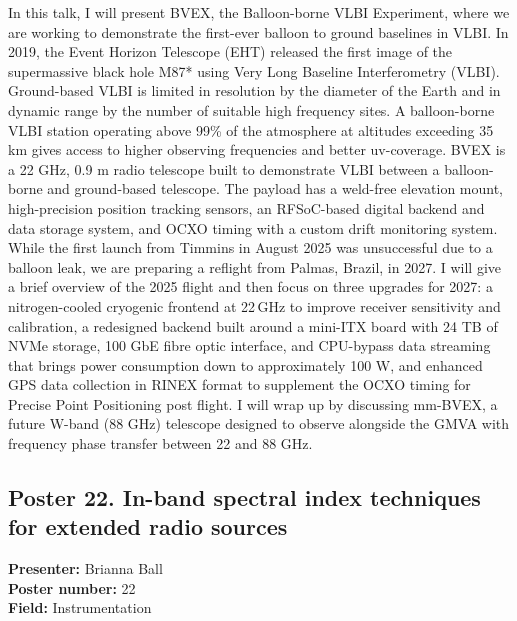 In this talk, I will present BVEX, the Balloon-borne VLBI Experiment, where we are working to demonstrate the first-ever balloon to ground baselines in VLBI. In 2019, the Event Horizon Telescope (EHT) released the first image of the supermassive black hole M87* using Very Long Baseline Interferometry (VLBI). Ground-based VLBI is limited in resolution by the diameter of the Earth and in dynamic range by the number of suitable high frequency sites. A balloon-borne VLBI station operating above 99\% of the atmosphere at altitudes exceeding 35 km gives access to higher observing frequencies and better uv-coverage. BVEX is a 22 GHz, 0.9 m radio telescope built to demonstrate VLBI between a balloon-borne and ground-based telescope. The payload has a weld-free elevation mount, high-precision position tracking sensors, an RFSoC-based digital backend and data storage system, and OCXO timing with a custom drift monitoring system. While the first launch from Timmins in August 2025 was unsuccessful due to a balloon leak, we are preparing a reflight from Palmas, Brazil, in 2027. I will give a brief overview of the 2025 flight and then focus on three upgrades for 2027: a nitrogen-cooled cryogenic frontend at 22\,GHz to improve receiver sensitivity and calibration, a redesigned backend built around a mini-ITX board with 24 TB of NVMe storage, 100 GbE fibre optic interface, and CPU-bypass data streaming that brings power consumption down to approximately 100 W, and enhanced GPS data collection in RINEX format to supplement the OCXO timing for Precise Point Positioning post flight. I will wrap up by discussing mm-BVEX, a future W-band (88 GHz) telescope designed to observe alongside the GMVA with frequency phase transfer between 22 and 88 GHz.

\hypertarget{poster-abstract-talk-47}{}\label{poster-abstract-page-talk-47}
\subsection*{Poster 22. In-band spectral index techniques for extended radio sources}
\textbf{Presenter:} Brianna Ball\\
\textbf{Poster number:} 22\\
\textbf{Field:} Instrumentation

